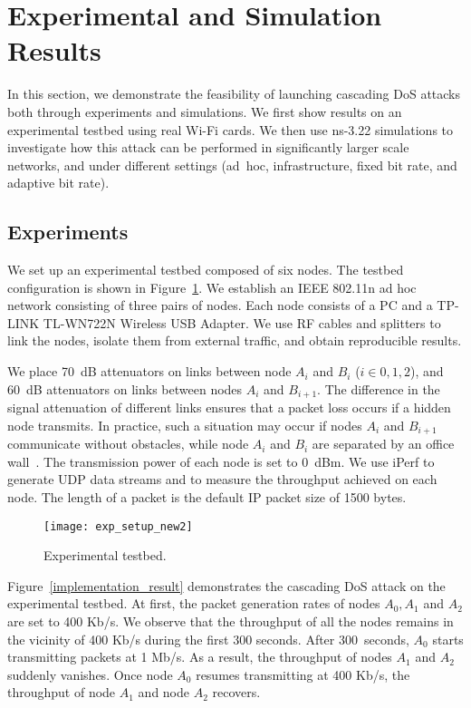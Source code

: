 \documentclass{IEEEtran}
\begin{document}
\section{Experimental and Simulation Results}
\label{Simulations and Experiment}
In this section, we demonstrate the feasibility of launching cascading DoS attacks both
through experiments and simulations. We first show results on an experimental testbed using real Wi-Fi cards.
We then use ns-3.22  simulations to investigate how this attack can be performed in significantly larger
scale networks, and under different settings (ad~hoc, infrastructure, fixed bit rate, and adaptive bit rate).

\subsection{Experiments}
\label{Experiment}
 We set up an experimental testbed composed of six nodes. The testbed
 configuration is shown in Figure~\ref{exp_setup}. We establish an
IEEE 802.11n ad hoc network consisting of three pairs of nodes. Each node
consists of a PC and a TP-LINK TL-WN722N Wireless USB Adapter. We use
RF cables and splitters to link the nodes, isolate them from
external traffic, and obtain reproducible results.

We place 70~dB attenuators on links between node $A_i$ and $B_i$ ($i \in 0,1,2$), and 60~dB attenuators
on links between nodes $A_i$ and $B_{i+1}$. The difference in the
signal attenuation of different links ensures that a packet loss occurs if a hidden node transmits. In practice, such a
situation may occur if nodes $A_i$ and $B_{i+1}$ communicate without obstacles, while node $A_i$ and $B_i$ are separated by an office
wall~\cite{stein1998indoor}.
The transmission power of each node is set to 0~dBm.
We use iPerf
\cite{IPERF} to generate UDP data streams and to measure the throughput achieved on
each node. The length of a packet is the default IP packet size of
1500 bytes.

\begin{figure}[!t]
\centering
\texttt{[image: exp\_setup\_new2]}
\caption{Experimental testbed.}
\label{exp_setup}
\end{figure}

Figure~\ref{implementation_result} demonstrates the cascading DoS
attack on the experimental testbed. At first,  the packet generation
rates of  nodes $A_0, A_1$ and $A_2$ are set to 400 Kb/s. We observe that the throughput of all the nodes
remains in the vicinity of 400 Kb/s during the first 300 seconds. After 300~seconds,
$A_0$ starts transmitting packets at 1 Mb/s. As a result, the throughput of nodes $A_1$ and $A_2$ suddenly
vanishes.  Once node $A_0$ resumes transmitting at 400 Kb/s, the
throughput of node $A_1$ and node $A_2$ recovers.
\end{document}
